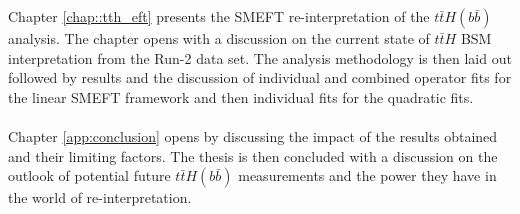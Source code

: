 \\
\\
Chapter \ref{chap::tth_eft} presents the SMEFT re-interpretation of the $t\bar{t}H(b\bar{b})$ analysis. The chapter opens with a discussion on the current state of $t\bar{t}H$ BSM interpretation from the Run-2 data set. The analysis methodology is then laid out followed by results and the discussion of individual and combined operator fits for the linear SMEFT framework and then individual fits for the quadratic fits.
\\
\\
Chapter \ref{app:conclusion} opens by discussing the impact of the results obtained and their limiting factors. The thesis is then concluded with a discussion on the outlook of potential future $t\bar{t}H(b\bar{b})$ measurements and the power they have in the world of re-interpretation. 





